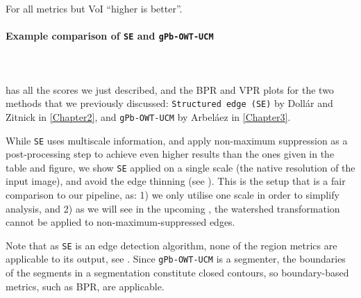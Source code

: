 For all metrics but VoI %
``higher is better''.

\paragraph*{Example comparison of {\tt SE} and {\tt gPb-OWT-UCM}}\mbox{}\\\mbox{}\\
 has all the scores we just described, and  the BPR and VPR plots for the two methods that we previously discussed: %
{\tt Structured edge (SE)} by Doll{\'a}r and Zitnick \cite{DollarICCV13edges} in \cref{Chapter2}, and {\tt gPb-OWT-UCM} by Arbel\'aez \etal \cite{Arbelaez11} in \cref{Chapter3}. 

While {\tt SE} uses multiscale information, and apply non-maximum suppression as a post-processing step to achieve even higher results %
than the ones given in the table and figure,
we show {\tt SE} applied on a single scale (the native resolution of the input image), and avoid the edge thinning (see ). This is the setup that is a fair comparison to our pipeline, as: 1) we only utilise one scale in order to simplify analysis, and 2) as we will see in the upcoming , 
the watershed transformation cannot be applied to non-maximum-suppressed edges.

Note that as {\tt SE} is an edge detection algorithm, none of the region metrics %
are applicable to its output, see . Since {\tt gPb-OWT-UCM} is a segmenter, the boundaries of the segments in a segmentation constitute closed contours, so boundary-based metrics, such as BPR, are applicable.

